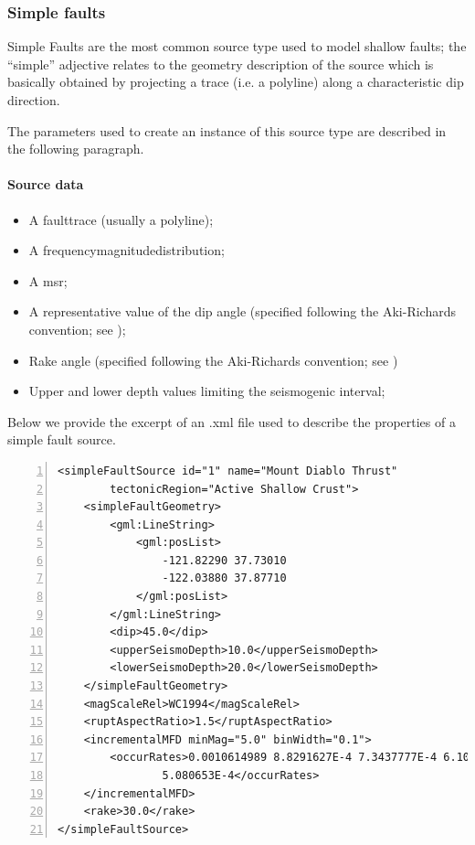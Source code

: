 \subsubsection{Simple faults}
%
Simple Faults are the most common source type used to model shallow 
faults; the ``simple'' adjective relates to the geometry description 
of the source which is basically obtained by projecting a trace 
(i.e. a polyline) along a characteristic dip direction. 

The parameters used to create an instance of this 
source type are described in the following paragraph.
%
\paragraph{Source data}
%
\begin{itemize}
\item A \gls{faulttrace} (usually a polyline); 
\item A \gls{frequencymagnitudedistribution};
\item A \gls{msr};
\item A representative value of the dip angle (specified following 
the Aki-Richards convention; see \citet{aki2002});
\item Rake angle (specified following the Aki-Richards convention; 
see \citet{aki2002}) 
\item Upper and lower depth values limiting the seismogenic interval; 
\end{itemize}
Below we provide the excerpt of an .xml file used to describe the 
properties of a simple fault source.
\begin{Verbatim}[frame=single, commandchars=\\\{\}, fontsize=\footnotesize,
    numbers=left, numbersep=2pt]
<simpleFaultSource id="1" name="Mount Diablo Thrust" 
		tectonicRegion="Active Shallow Crust">
    <simpleFaultGeometry>
        <gml:LineString>
            <gml:posList>
                -121.82290 37.73010
                -122.03880 37.87710
            </gml:posList>
        </gml:LineString>
        <dip>45.0</dip>
        <upperSeismoDepth>10.0</upperSeismoDepth>
        <lowerSeismoDepth>20.0</lowerSeismoDepth>
    </simpleFaultGeometry>
    <magScaleRel>WC1994</magScaleRel>
    <ruptAspectRatio>1.5</ruptAspectRatio>
    <incrementalMFD minMag="5.0" binWidth="0.1">
        <occurRates>0.0010614989 8.8291627E-4 7.3437777E-4 6.108288E-4 
				5.080653E-4</occurRates>
    </incrementalMFD>
    <rake>30.0</rake>
</simpleFaultSource>
\end{Verbatim}
%
